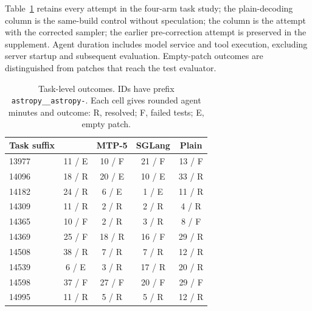 Table~\ref{tab:swe-tasks} retains every attempt in the four-arm task study; the plain-decoding column is the same-build control without speculation; the \sys{} column is the attempt with the corrected sampler; the earlier pre-correction attempt is preserved in the supplement. Agent duration includes model service and tool execution, excluding server startup and subsequent evaluation. Empty-patch outcomes are distinguished from patches that reach the test evaluator.

\begin{table}[!htbp]
\caption{Task-level outcomes. IDs have prefix \texttt{astropy\_\_astropy-}. Each cell gives rounded agent minutes and outcome: R, resolved; F, failed tests; E, empty patch.}
\label{tab:swe-tasks}
\centering\small
\begin{tabular}{@{}lcccc@{}}
\toprule
Task suffix & \sys{} & MTP-5 & SGLang & Plain \\
\midrule
13977 & 11 / E & 10 / F & 21 / F & 13 / F \\
14096 & 18 / R & 20 / E & 10 / E & 33 / R \\
14182 & 24 / R & 6 / E & 1 / E & 11 / R \\
14309 & 11 / R & 2 / R & 2 / R & 4 / R \\
14365 & 10 / F & 2 / R & 3 / R & 8 / F \\
14369 & 25 / F & 18 / R & 16 / F & 29 / R \\
14508 & 38 / R & 7 / R & 7 / R & 12 / R \\
14539 & 6 / E & 3 / R & 17 / R & 20 / R \\
14598 & 37 / F & 27 / F & 20 / F & 29 / F \\
14995 & 11 / R & 5 / R & 5 / R & 12 / R \\
\bottomrule
\end{tabular}
\end{table}
